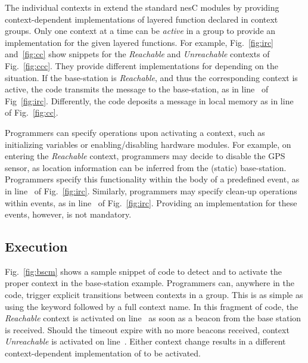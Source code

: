 

The individual contexts in \conesc extend the standard nesC modules by
providing context-dependent implementations of layered function
declared in context groups. Only one context at a time can be
\emph{active} in a group to provide an implementation for the given
layered functions. For example, Fig.~\ref{fig:irc} and~\ref{fig:cc}
show \conesc snippets for the \emph{Reachable} and \emph{Unreachable}
contexts of Fig.~\ref{fig:ccc}. They provide different implementations
for  depending on the situation. If the base-station is
\emph{Reachable}, and thus the corresponding context is active, the
code transmits the message to the base-station, as in
line~ of Fig~\ref{fig:irc}. Differently, the code
deposits a message in local memory as in line~ of
Fig.~\ref{fig:cc}.

Programmers can specify operations upon activating a context, such as
initializing variables or enabling/disabling hardware modules. For
example, on entering the \emph{Reachable} context, programmers may
decide to disable the GPS sensor, as location information can be
inferred from the (static) base-station. Programmers specify this
functionality within the body of a predefined  event,
as in line~ of
Fig.~\ref{fig:irc}. Similarly, programmers may specify clean-up
operations within  events, as in
line~ of Fig.~\ref{fig:irc}.  Providing
an implementation for these events, however, is not mandatory.

\subsection{Execution}\label{subsec:usage}



Fig.~\ref{fig:bscm} shows a sample snippet of code to detect and to
activate the proper context in the base-station example. Programmers
can, anywhere in the code, trigger explicit transitions between contexts
in a group. This is as simple as using the  keyword
followed by a full context name. In this fragment of code, the
\emph{Reachable} context is activated on line~ as soon
as a beacon from the base station is received. Should the timeout
expire with no more beacons received, context \emph{Unreachable} is
activated on line~. Either context change results in a
different context-dependent implementation of  to be
activated.

